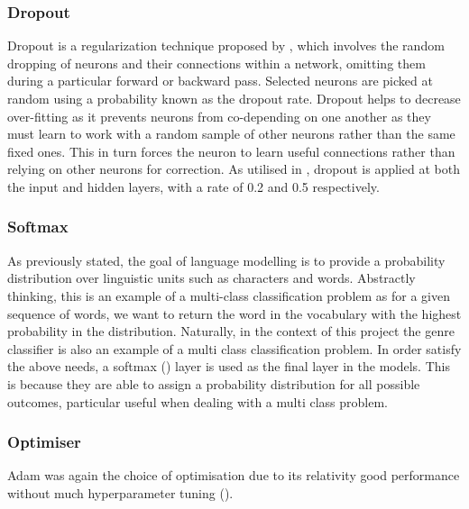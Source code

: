 \subsubsection{Dropout}
Dropout is a regularization technique proposed by \cite{Srivastava2014}, which involves the random dropping of neurons and their connections within a network, omitting them during a particular forward or backward pass. Selected neurons are picked at random using a probability known as the dropout rate. Dropout helps to decrease over-fitting as it prevents neurons from co-depending on one another as they must learn to work with a random sample of other neurons rather than the same fixed ones. This in turn forces the neuron to learn useful connections rather than relying on other neurons for correction. As utilised in \cite{Srivastava2014}, dropout is applied at both the input and hidden layers, with a rate of 0.2 and 0.5 respectively.
\subsubsection{Softmax}
As previously stated, the goal of language modelling is to provide a probability distribution over linguistic units such as characters and words. Abstractly thinking, this is an example of a multi-class classification problem as for a given sequence of words, we want to return the word in the vocabulary with the highest probability in the distribution. Naturally, in the context of this project the genre classifier is also an example of a multi class classification problem. In order satisfy the above needs, a softmax (\cite{Bridle1990}) layer is used as the final layer in the models. This is because they are able to assign a probability distribution for all possible outcomes, particular useful when dealing with a multi class problem.
\subsubsection{Optimiser}
Adam was again the choice of optimisation due to its relativity good performance without much hyperparameter tuning (\cite{Goodfellow-et-al-2016}).


